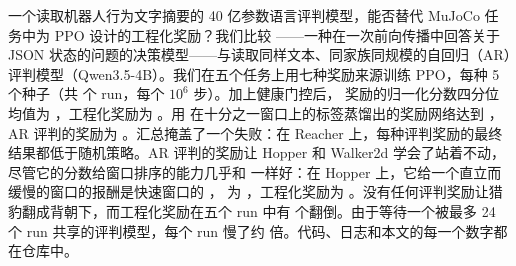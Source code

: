 一个读取机器人行为文字摘要的 40 亿参数语言评判模型，能否替代 MuJoCo 任务中为 PPO 设计的工程化奖励？我们比较 \kev{}——一种在一次前向传播中回答关于 JSON 状态的问题的决策模型——与读取同样文本、同家族同规模的自回归（AR）评判模型（Qwen3.5-4B）。我们在五个任务上用七种奖励来源训练 PPO，每种 5 个种子（共  个 run，每个 $10^6$ 步）。加上健康门控后，\kev{} 奖励的归一化分数四分位均值为  ，工程化奖励为 。用 \kev{} 在十分之一窗口上的标签蒸馏出的奖励网络达到 ，AR 评判的奖励为 。汇总掩盖了一个失败：在 Reacher 上，每种评判奖励的最终结果都低于随机策略。AR 评判的奖励让 Hopper 和 Walker2d 学会了站着不动，尽管它的分数给窗口排序的能力几乎和 \kev{} 一样好：在 Hopper 上，它给一个直立而缓慢的窗口的报酬是快速窗口的 ，\kev{} 为 ，工程化奖励为 。没有任何评判奖励让猎豹翻成背朝下，而工程化奖励在五个 run 中有  个翻倒。由于等待一个被最多 24 个 run 共享的评判模型，每个 run 慢了约  倍。代码、日志和本文的每一个数字都在仓库中。

